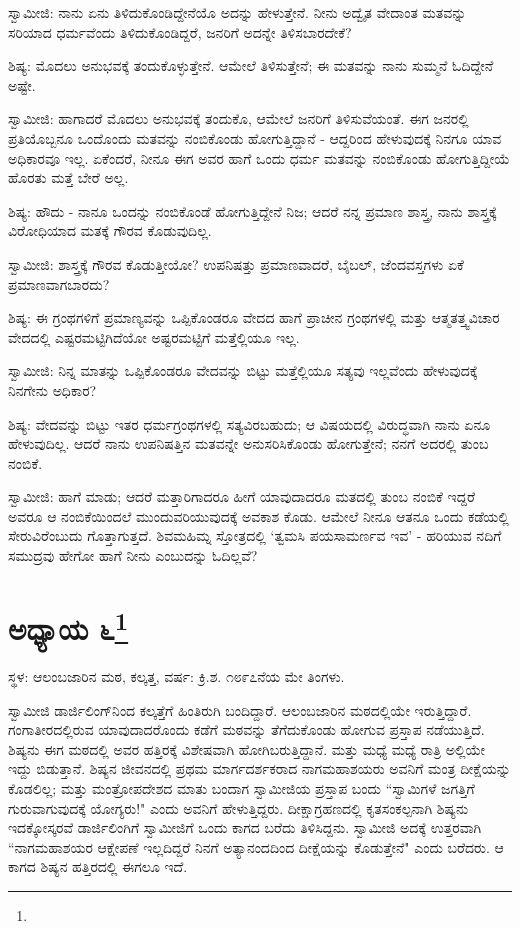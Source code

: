ಸ್ವಾಮೀಜಿ: ನಾನು ಏನು ತಿಳಿದುಕೊಂಡಿದ್ದೇನೆಯೊ ಅದನ್ನು ಹೇಳುತ್ತೇನೆ. ನೀನು ಅದ್ವೈತ ವೇದಾಂತ ಮತವನ್ನು ಸರಿಯಾದ ಧರ್ಮವೆಂದು ತಿಳಿದುಕೊಂಡಿದ್ದರೆ, ಜನರಿಗೆ ಅದನ್ನೇ ತಿಳಿಸಬಾರದೇಕೆ?

ಶಿಷ್ಯ: ಮೊದಲು ಅನುಭವಕ್ಕೆ ತಂದುಕೊಳ್ಳುತ್ತೇನೆ. ಆಮೇಲೆ ತಿಳಿಸುತ್ತೇನೆ; ಈ ಮತವನ್ನು ನಾನು ಸುಮ್ಮನೆ ಓದಿದ್ದೇನೆ ಅಷ್ಟೇ.

ಸ್ವಾಮೀಜಿ: ಹಾಗಾದರೆ ಮೊದಲು ಅನುಭವಕ್ಕೆ ತಂದುಕೊ, ಆಮೇಲೆ ಜನರಿಗೆ ತಿಳಿಸುವೆಯಂತೆ. ಈಗ ಜನರಲ್ಲಿ ಪ್ರತಿಯೊಬ್ಬನೂ ಒಂದೊಂದು ಮತವನ್ನು ನಂಬಿಕೊಂಡು ಹೋಗುತ್ತಿದ್ದಾನೆ - ಆದ್ದರಿಂದ ಹೇಳುವುದಕ್ಕೆ ನಿನಗೂ ಯಾವ ಅಧಿಕಾರವೂ ಇಲ್ಲ. ಏಕೆಂದರೆ, ನೀನೂ ಈಗ ಅವರ ಹಾಗೆ ಒಂದು ಧರ್ಮ ಮತವನ್ನು ನಂಬಿಕೊಂಡು ಹೋಗುತ್ತಿದ್ದೀಯೆ ಹೊರತು ಮತ್ತೆ ಬೇರೆ ಅಲ್ಲ.

ಶಿಷ್ಯ: ಹೌದು - ನಾನೂ ಒಂದನ್ನು ನಂಬಿಕೊಂಡೆ ಹೋಗುತ್ತಿದ್ದೇನೆ ನಿಜ; ಆದರೆ ನನ್ನ ಪ್ರಮಾಣ ಶಾಸ್ತ್ರ, ನಾನು ಶಾಸ್ತ್ರಕ್ಕೆ ವಿರೋಧಿಯಾದ ಮತಕ್ಕೆ ಗೌರವ ಕೊಡುವುದಿಲ್ಲ.

ಸ್ವಾಮೀಜಿ: ಶಾಸ್ತ್ರಕ್ಕೆ ಗೌರವ ಕೊಡುತ್ತೀಯೋ? ಉಪನಿಷತ್ತು ಪ್ರಮಾಣವಾದರೆ, ಬೈಬಲ್, ಜೆಂದವಸ್ತಗಳು ಏಕೆ ಪ್ರಮಾಣವಾಗಬಾರದು?

ಶಿಷ್ಯ: ಈ ಗ್ರಂಥಗಳಿಗೆ ಪ್ರಮಾಣ್ಯವನ್ನು ಒಪ್ಪಿಕೊಂಡರೂ ವೇದದ ಹಾಗೆ ಪ್ರಾಚೀನ ಗ್ರಂಥಗಳಲ್ಲಿ ಮತ್ತು ಆತ್ಮತತ್ತ್ವವಿಚಾರ ವೇದದಲ್ಲಿ ಎಷ್ಟರಮಟ್ಟಿಗಿದೆಯೋ ಅಷ್ಟರಮಟ್ಟಿಗೆ ಮತ್ತೆಲ್ಲಿಯೂ ಇಲ್ಲ.

ಸ್ವಾಮೀಜಿ: ನಿನ್ನ ಮಾತನ್ನು ಒಪ್ಪಿಕೊಂಡರೂ ವೇದವನ್ನು ಬಿಟ್ಟು ಮತ್ತೆಲ್ಲಿಯೂ ಸತ್ಯವು ಇಲ್ಲವೆಂದು ಹೇಳುವುದಕ್ಕೆ ನಿನಗೇನು ಅಧಿಕಾರ?

ಶಿಷ್ಯ: ವೇದವನ್ನು ಬಿಟ್ಟು ಇತರ ಧರ್ಮಗ್ರಂಥಗಳಲ್ಲಿ ಸತ್ಯವಿರಬಹುದು; ಆ ವಿಷಯದಲ್ಲಿ ವಿರುದ್ಧವಾಗಿ ನಾನು ಏನೂ ಹೇಳುವುದಿಲ್ಲ. ಆದರೆ ನಾನು ಉಪನಿಷತ್ತಿನ ಮತವನ್ನೇ ಅನುಸರಿಸಿಕೊಂಡು ಹೋಗುತ್ತೇನೆ; ನನಗೆ ಅದರಲ್ಲಿ ತುಂಬ ನಂಬಿಕೆ.

ಸ್ವಾಮೀಜಿ: ಹಾಗೆ ಮಾಡು; ಆದರೆ ಮತ್ತಾರಿಗಾದರೂ ಹೀಗೆ ಯಾವುದಾದರೂ ಮತದಲ್ಲಿ ತುಂಬ ನಂಬಿಕೆ ಇದ್ದರೆ ಅವರೂ ಆ ನಂಬಿಕೆಯಿಂದಲೆ ಮುಂದುವರಿಯುವುದಕ್ಕೆ ಅವಕಾಶ ಕೊಡು. ಆಮೇಲೆ ನೀನೂ ಆತನೂ ಒಂದು ಕಡೆಯಲ್ಲಿ ಸೇರುವಿರೆಂಬುದು ಗೊತ್ತಾಗುತ್ತದೆ. ಶಿವಮಹಿಮ್ನ ಸ್ತೋತ್ರದಲ್ಲಿ ‘ತ್ವಮಸಿ ಪಯಸಾಮರ್ಣವ ಇವ’ - ಹರಿಯುವ ನದಿಗೆ ಸಮುದ್ರವು ಹೇಗೋ ಹಾಗೆ ನೀನು ಎಂಬುದನ್ನು ಓದಿಲ್ಲವೆ?

\newpage

\chapter[ಅಧ್ಯಾಯ ೬]{ಅಧ್ಯಾಯ ೬\protect\footnote{}}

\centerline{ಸ್ಥಳ: ಆಲಂಬಜಾರಿನ ಮಠ, ಕಲ್ಕತ್ತ, ವರ್ಷ: ಕ್ರಿ.ಶ. ೧೮೯೭ನೆಯ ಮೇ ತಿಂಗಳು.}

ಸ್ವಾಮೀಜಿ ಡಾರ್ಜಿಲಿಂಗ್‌ನಿಂದ ಕಲ್ಕತ್ತೆಗೆ ಹಿಂತಿರುಗಿ ಬಂದಿದ್ದಾರೆ. ಆಲಂಬಜಾರಿನ ಮಠದಲ್ಲಿಯೇ ಇರುತ್ತಿದ್ದಾರೆ. ಗಂಗಾತೀರದಲ್ಲಿರುವ ಯಾವುದಾದರೊಂದು ಕಡೆಗೆ ಮಠವನ್ನು ತೆಗೆದುಕೊಂಡು ಹೋಗುವ ಪ್ರಸ್ತಾಪ ನಡೆಯುತ್ತಿದೆ. ಶಿಷ್ಯನು ಈಗ ಮಠದಲ್ಲಿ ಅವರ ಹತ್ತಿರಕ್ಕೆ ವಿಶೇಷವಾಗಿ ಹೋಗಿಬರುತ್ತಿದ್ದಾನೆ. ಮತ್ತು ಮಧ್ಯೆ ಮಧ್ಯೆ ರಾತ್ರಿ ಅಲ್ಲಿಯೇ ಇದ್ದು ಬಿಡುತ್ತಾನೆ. ಶಿಷ್ಯನ ಜೀವನದಲ್ಲಿ ಪ್ರಥಮ ಮಾರ್ಗದರ್ಶಕರಾದ ನಾಗಮಹಾಶಯರು ಅವನಿಗೆ ಮಂತ್ರ ದೀಕ್ಷೆಯನ್ನು ಕೊಡಲಿಲ್ಲ; ಮತ್ತು ಮಂತ್ರೋಪದೇಶದ ಮಾತು ಬಂದಾಗ ಸ್ವಾಮೀಜಿಯ ಪ್ರಸ್ತಾಪ ಬಂದು “ಸ್ವಾಮಿಗಳೆ ಜಗತ್ತಿಗೆ ಗುರುವಾಗುವುದಕ್ಕೆ ಯೋಗ್ಯರು!" ಎಂದು ಅವನಿಗೆ ಹೇಳುತ್ತಿದ್ದರು. ದೀಕ್ಷಾಗ್ರಹಣದಲ್ಲಿ ಕೃತಸಂಕಲ್ಪನಾಗಿ ಶಿಷ್ಯನು ಇದಕ್ಕೋಸ್ಕರವೆ ಡಾರ್ಜಿಲಿಂಗಿಗೆ ಸ್ವಾಮೀಜಿಗೆ ಒಂದು ಕಾಗದ ಬರೆದು ತಿಳಿಸಿದ್ದನು. ಸ್ವಾಮೀಜಿ ಅದಕ್ಕೆ ಉತ್ತರವಾಗಿ “ನಾಗಮಹಾಶಯರ ಆಕ್ಷೇಪಣೆ ಇಲ್ಲದಿದ್ದರೆ ನಿನಗೆ ಅತ್ಯಾನಂದದಿಂದ ದೀಕ್ಷೆಯನ್ನು ಕೊಡುತ್ತೇನೆ" ಎಂದು ಬರೆದರು. ಆ ಕಾಗದ ಶಿಷ್ಯನ ಹತ್ತಿರದಲ್ಲಿ ಈಗಲೂ ಇದೆ.


